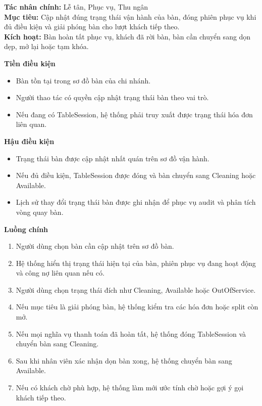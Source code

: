 \documentclass[11pt,a4paper]{article}
\begin{document}
    \begin{usecasebox}[title={UC-RES-04 --- Cập nhật trạng thái bàn và giải phóng bàn}]
    \textbf{Tác nhân chính:} Lễ tân, Phục vụ, Thu ngân\\
    \textbf{Mục tiêu:} Cập nhật đúng trạng thái vận hành của bàn, đóng phiên phục vụ khi đủ điều kiện và giải phóng bàn cho lượt khách tiếp theo.\\
    \textbf{Kích hoạt:} Bàn hoàn tất phục vụ, khách đã rời bàn, bàn cần chuyển sang dọn dẹp, mở lại hoặc tạm khóa.

    \medskip
    \textbf{Tiền điều kiện}
    \begin{itemize}[leftmargin=1.8em]
  \item Bàn tồn tại trong sơ đồ bàn của chi nhánh.
  \item Người thao tác có quyền cập nhật trạng thái bàn theo vai trò.
  \item Nếu đang có \textsf{TableSession}, hệ thống phải truy xuất được trạng thái hóa đơn liên quan.
\end{itemize}

    \textbf{Hậu điều kiện}
    \begin{itemize}[leftmargin=1.8em]
  \item Trạng thái bàn được cập nhật nhất quán trên sơ đồ vận hành.
  \item Nếu đủ điều kiện, \textsf{TableSession} được đóng và bàn chuyển sang \textsf{Cleaning} hoặc \textsf{Available}.
  \item Lịch sử thay đổi trạng thái bàn được ghi nhận để phục vụ audit và phân tích vòng quay bàn.
\end{itemize}

    \textbf{Luồng chính}
    \begin{enumerate}[leftmargin=1.8em]
  \item Người dùng chọn bàn cần cập nhật trên sơ đồ bàn.
  \item Hệ thống hiển thị trạng thái hiện tại của bàn, phiên phục vụ đang hoạt động và công nợ liên quan nếu có.
  \item Người dùng chọn trạng thái đích như \textsf{Cleaning}, \textsf{Available} hoặc \textsf{OutOfService}.
  \item Nếu mục tiêu là giải phóng bàn, hệ thống kiểm tra các hóa đơn hoặc split còn mở.
  \item Nếu mọi nghĩa vụ thanh toán đã hoàn tất, hệ thống đóng \textsf{TableSession} và chuyển bàn sang \textsf{Cleaning}.
  \item Sau khi nhân viên xác nhận dọn bàn xong, hệ thống chuyển bàn sang \textsf{Available}.
  \item Nếu có khách chờ phù hợp, hệ thống làm mới ước tính chờ hoặc gợi ý gọi khách tiếp theo.
\end{enumerate}


\end{usecasebox}
\end{document}
